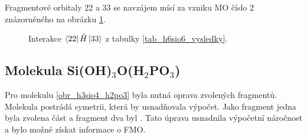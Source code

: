 \documentclass[
  digital, %
  table,   %
  lof,     %
  lot,     %
]{fithesis3}
\begin{document}
  Fragmentové orbitaly  22 a 33 se navzájem mísí za vzniku MO číslo 2 znázorněného na obrázku \ref{obr_h6sio6_vysledky_III}.   
\begin{figure}
\begin{center}
\caption{Interakce $\bra{22}{\hat{H}}\ket{33}$ z tabulky \ref{tab_h6sio6_vysledky}.}

\label{obr_h6sio6_vysledky_III}\end{center}
\end{figure} 
 \subsection{Molekula Si(OH)$_3$O(H$_2$PO$_3$)}
 Pro molekulu  \ref{obr_h3sio4_h2po3} byla nutná oprava zvolených fragmentů. Molekula postrádá symetrii, která by usnadňovala výpočet. Jako fragment jedna byla zvolena část  a fragment dva byl . Tato úprava usnadnila výpočetní náročnost a bylo možné získat informace o FMO. 

\begin{figure}
\begin{center}
\label{obr_SiOH3OH2PO)_vysledky_I}
\end{center}
\end{figure}
\end{document}
